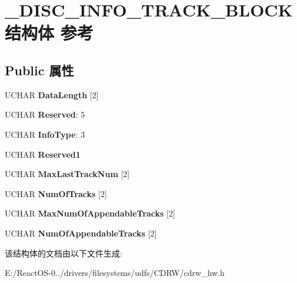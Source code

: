 \hypertarget{struct___d_i_s_c___i_n_f_o___t_r_a_c_k___b_l_o_c_k}{}\section{\+\_\+\+D\+I\+S\+C\+\_\+\+I\+N\+F\+O\+\_\+\+T\+R\+A\+C\+K\+\_\+\+B\+L\+O\+C\+K结构体 参考}
\label{struct___d_i_s_c___i_n_f_o___t_r_a_c_k___b_l_o_c_k}
\subsection*{Public 属性}
\begin{DoxyCompactItemize}
\item 
\mbox{\label{struct___d_i_s_c___i_n_f_o___t_r_a_c_k___b_l_o_c_k_a4c5fb29d053091f7d8f7916b14ca4ba6}} 
U\+C\+H\+AR {\bfseries Data\+Length} \mbox{[}2\mbox{]}
\item 
\mbox{\label{struct___d_i_s_c___i_n_f_o___t_r_a_c_k___b_l_o_c_k_ada268e1b1a18d6ea1149b3581c483e02}} 
U\+C\+H\+AR {\bfseries Reserved}\+: 5
\item 
\mbox{\label{struct___d_i_s_c___i_n_f_o___t_r_a_c_k___b_l_o_c_k_a6c7c3fe8ad30adea424a2cc855cd4851}} 
U\+C\+H\+AR {\bfseries Info\+Type}\+: 3
\item 
\mbox{\label{struct___d_i_s_c___i_n_f_o___t_r_a_c_k___b_l_o_c_k_ae729793b200c3096672c51f3f60c9dae}} 
U\+C\+H\+AR {\bfseries Reserved1}
\item 
\mbox{\label{struct___d_i_s_c___i_n_f_o___t_r_a_c_k___b_l_o_c_k_a79376bf43df22961d017f426c13832a1}} 
U\+C\+H\+AR {\bfseries Max\+Last\+Track\+Num} \mbox{[}2\mbox{]}
\item 
\mbox{\label{struct___d_i_s_c___i_n_f_o___t_r_a_c_k___b_l_o_c_k_a7cc2905bbdd14aafd9525f1a53ced11d}} 
U\+C\+H\+AR {\bfseries Num\+Of\+Tracks} \mbox{[}2\mbox{]}
\item 
\mbox{\label{struct___d_i_s_c___i_n_f_o___t_r_a_c_k___b_l_o_c_k_ae1fc90891746516fe606a0094223a3ab}} 
U\+C\+H\+AR {\bfseries Max\+Num\+Of\+Appendable\+Tracks} \mbox{[}2\mbox{]}
\item 
\mbox{\label{struct___d_i_s_c___i_n_f_o___t_r_a_c_k___b_l_o_c_k_a8d48700dc7d5a50067b093491be773e4}} 
U\+C\+H\+AR {\bfseries Num\+Of\+Appendable\+Tracks} \mbox{[}2\mbox{]}
\end{DoxyCompactItemize}


该结构体的文档由以下文件生成\+:\begin{DoxyCompactItemize}
\item 
E\+:/\+React\+O\+S-\/0../drivers/filesystems/udfs/\+C\+D\+R\+W/cdrw\+\_\+hw.\+h\end{DoxyCompactItemize}
